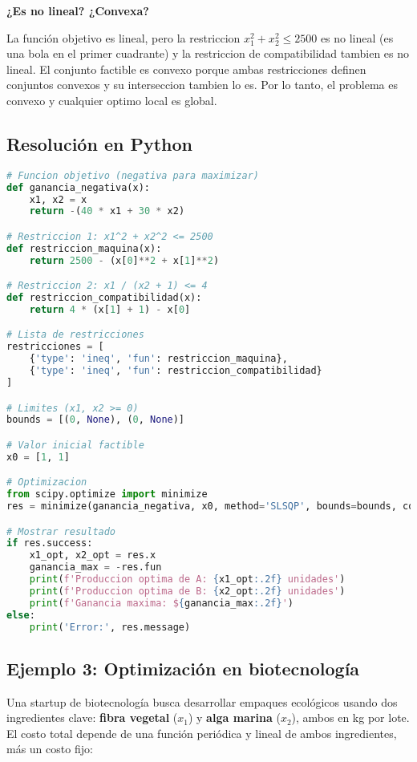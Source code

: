 \documentclass[12pt]{article}
\begin{document}
\textbf{¿Es no lineal? ¿Convexa?}

\vspace{0.3em}

La función objetivo es lineal, pero la restriccion $x_1^2 + x_2^2 \leq 2500$ es no lineal (es una bola en el primer cuadrante) y la restriccion de compatibilidad tambien es no lineal. El conjunto factible es convexo porque ambas restricciones definen conjuntos convexos y su interseccion tambien lo es. Por lo tanto, el problema es convexo y cualquier optimo local es global.

\subsection{Resolución en Python}

\begin{lstlisting}[language=Python]
# Funcion objetivo (negativa para maximizar)
def ganancia_negativa(x):
    x1, x2 = x
    return -(40 * x1 + 30 * x2)

# Restriccion 1: x1^2 + x2^2 <= 2500
def restriccion_maquina(x):
    return 2500 - (x[0]**2 + x[1]**2)

# Restriccion 2: x1 / (x2 + 1) <= 4
def restriccion_compatibilidad(x):
    return 4 * (x[1] + 1) - x[0]

# Lista de restricciones
restricciones = [
    {'type': 'ineq', 'fun': restriccion_maquina},
    {'type': 'ineq', 'fun': restriccion_compatibilidad}
]

# Limites (x1, x2 >= 0)
bounds = [(0, None), (0, None)]

# Valor inicial factible
x0 = [1, 1]

# Optimizacion
from scipy.optimize import minimize
res = minimize(ganancia_negativa, x0, method='SLSQP', bounds=bounds, constraints=restricciones)

# Mostrar resultado
if res.success:
    x1_opt, x2_opt = res.x
    ganancia_max = -res.fun
    print(f'Produccion optima de A: {x1_opt:.2f} unidades')
    print(f'Produccion optima de B: {x2_opt:.2f} unidades')
    print(f'Ganancia maxima: ${ganancia_max:.2f}')
else:
    print('Error:', res.message)
\end{lstlisting}

\subsection{Ejemplo 3: Optimización en biotecnología}

Una startup de biotecnología busca desarrollar empaques ecológicos usando dos ingredientes clave: \textbf{fibra vegetal} ($x_1$) y \textbf{alga marina} ($x_2$), ambos en kg por lote. El costo total depende de una función periódica y lineal de ambos ingredientes, más un costo fijo:
\end{document}
